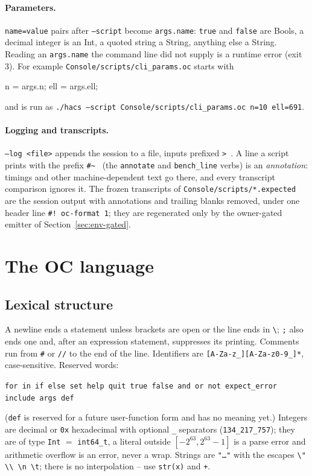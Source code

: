 \documentclass[11pt,openany]{report}
\newcommand{\cli}[1]{\texttt{#1}}
\newcommand{\file}[1]{\nolinkurl{#1}}
\newcommand{\vb}[1]{\texttt{#1}}
\newcommand{\excerptfrom}[1]{\par\smallskip\noindent{\small\textit{From} \nolinkurl{Console/scripts/#1}:}\par\nopagebreak}
\begin{document}
\paragraph{Parameters.} \texttt{name=value} pairs after \cli{--script} become \vb{args.name}: \vb{true}
and \vb{false} are Bools, a decimal integer is an Int, a quoted string a String, anything else a String.
Reading an \vb{args.name} the command line did not supply is a runtime error (exit 3). For example
\file{Console/scripts/cli_params.oc} starts with

\excerptfrom{cli_params.oc}
\begin{ocexcerpt}
n = args.n;
ell = args.ell;
\end{ocexcerpt}
and is run as \cli{./hacs --script Console/scripts/cli\_params.oc n=10 ell=691}.

\paragraph{Logging and transcripts.} \cli{--log <file>} appends the session to a file, inputs prefixed
\texttt{> }. A line a script prints with the prefix \texttt{\#\textasciitilde{} } (the \vb{annotate} and
\vb{bench\_line} verbs) is an \emph{annotation}: timings and other machine-dependent text go there, and
every transcript comparison ignores it. The frozen transcripts of \file{Console/scripts/*.expected} are
the session output with annotations and trailing blanks removed, under one header line
\texttt{\#! oc-format 1}; they are regenerated only by the owner-gated emitter of
Section~\ref{sec:env-gated}.

\section{The OC language}\label{sec:language}

\subsection{Lexical structure}

A newline ends a statement unless brackets are open or the line ends in \verb|\|; \texttt{;} also ends
one and, after an expression statement, suppresses its printing. Comments run from \texttt{\#} or
\texttt{//} to the end of the line. Identifiers are \verb|[A-Za-z_][A-Za-z0-9_]*|, case-sensitive.
Reserved words:
\begin{center}
\texttt{for in if else set help quit true false and or not expect\_error include args def}
\end{center}
(\texttt{def} is reserved for a future user-function form and has no meaning yet.) Integers are decimal or
\texttt{0x} hexadecimal with optional \texttt{\_} separators (\texttt{134\_217\_757}); they are of type
\vb{Int} $=$ \texttt{int64\_t}, a literal outside $[-2^{63},2^{63}-1]$ is a parse error and arithmetic
overflow is an error, never a wrap. Strings are \texttt{"\dots"} with the escapes
\verb|\" \\ \n \t|; there is no interpolation -- use \vb{str(x)} and \texttt{+}.
\end{document}
